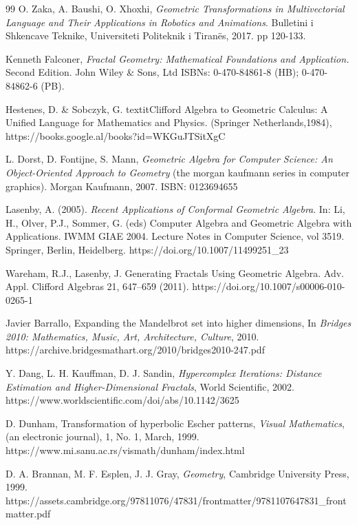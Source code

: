 \documentclass{amsart}
\theoremstyle{plain}
\numberwithin{equation}{section}
\begin{document}
\begin{thebibliography}{99}
O. Zaka, A. Baushi, O. Xhoxhi,
\textit{Geometric Transformations in Multivectorial Language and Their Applications in Robotics and Animations}. Bulletini i Shkencave Teknike, Universiteti Politeknik i Tiranës, 2017. pp 120-133.

Kenneth Falconer,
\textit{Fractal Geometry: Mathematical Foundations and Application.} Second Edition. John Wiley \& Sons, Ltd ISBNs: 0-470-84861-8 (HB); 0-470-84862-6 (PB).

Hestenes, D. \& Sobczyk, G. textit{Clifford Algebra to Geometric Calculus: A Unified Language for Mathematics and Physics}. (Springer Netherlands,1984), https://books.google.al/books?id=WKGuJTSitXgC

L. Dorst, D. Fontijne, S. Mann,
\textit{Geometric Algebra for Computer Science: An Object-Oriented Approach to Geometry} (the morgan kaufmann series in computer graphics). Morgan Kaufmann, 2007. ISBN: 0123694655

Lasenby, A. (2005). \textit{Recent Applications of Conformal Geometric Algebra}. In: Li, H., Olver, P.J., Sommer, G. (eds) Computer Algebra and Geometric Algebra with Applications. IWMM GIAE 2004. Lecture Notes in Computer Science, vol 3519. Springer, Berlin, Heidelberg. https://doi.org/10.1007/11499251\_23

Wareham, R.J., Lasenby, J. Generating Fractals Using Geometric Algebra. Adv. Appl. Clifford Algebras 21, 647–659 (2011). https://doi.org/10.1007/s00006-010-0265-1

Javier Barrallo,
Expanding the Mandelbrot set into higher dimensions,
In \textit{Bridges 2010: Mathematics, Music, Art, Architecture, Culture}, 2010. https://archive.bridgesmathart.org/2010/bridges2010-247.pdf

Y. Dang, L. H. Kauffman, D. J. Sandin,
\textit{Hypercomplex Iterations: Distance Estimation and Higher-Dimensional Fractals}, World Scientific, 2002. https://www.worldscientific.com/doi/abs/10.1142/3625


D. Dunham,
Transformation of hyperbolic Escher patterns,
\textit{Visual Mathematics},(an electronic journal), 1, No. 1, March, 1999. https://www.mi.sanu.ac.rs/vismath/dunham/index.html

D. A. Brannan, M. F. Esplen, J. J. Gray,
\textit{Geometry},
Cambridge University Press, 1999. https://assets.cambridge.org/97811076/47831/frontmatter/9781107647831\_frontmatter.pdf


\end{thebibliography}
\end{document}
